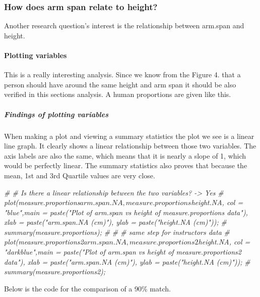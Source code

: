 \documentclass[]{article}
\newenvironment{Shaded}{\begin{snugshade}}{\end{snugshade}}
\newcommand{\CommentTok}[1]{\textcolor[rgb]{0.56,0.35,0.01}{\textit{#1}}}
\begin{document}
\newpage

\subsubsection{How does arm span relate to height?}
\label{sec:appendix-arm-span-vs-height}

Another research question's interest is the relationship between
arm.span and height.

\paragraph{Plotting variables}
\label{sec:appendix-plotting-variables}

This is a really interesting analysis. Since we know from the Figure 4.
that a person should have around the same height and arm span it should
be also verified in this sections analysis. A human proportions are
given like this.

\subparagraph{Findings of plotting variables}
\label{sec:appendix-findings-plotting}

When making a plot and viewing a summary statistics the plot we see is a
linear line graph. It clearly shows a linear relationship between those
two variables. The axis labels are also the same, which means that it is
nearly a slope of 1, which would be perfectly linear. The summary
statistics also proves that because the mean, 1st and 3rd Quartile
values are very close.

\begin{Shaded}
\begin{Highlighting}[]
\CommentTok{\# \# Is there a linear relationship between the two variables? {-}\textgreater{} Yes}
\CommentTok{\# plot(measure.proportions$arm.span.NA, measure.proportions$height.NA, col = "blue",main = paste("Plot of arm.span vs height of measure.proportions data"), xlab = paste("arm.span.NA (cm)"), ylab = paste("height.NA (cm)"));}
\CommentTok{\# summary(measure.proportions);}
\CommentTok{\# }
\CommentTok{\# \# same step for instructors data}
\CommentTok{\# plot(measure.proportions2$arm.span.NA, measure.proportions2$height.NA, col = "darkblue",main = paste("Plot of arm.span vs height of measure.proportions2 data"), xlab = paste("arm.span.NA (cm)"), ylab = paste("height.NA (cm)"));}
\CommentTok{\# summary(measure.proportions2);}
\end{Highlighting}
\end{Shaded}

Below is the code for the comparison of a 90\% match.
\end{document}
